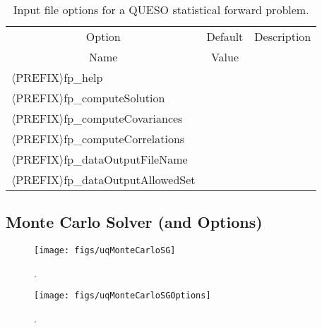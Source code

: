 \begin{table}[!h]
\begin{center}
\begin{tabular}{|l|c|c|}
\hline
\multicolumn{1}{|c|}{Option}                     & Default & Description \\
\multicolumn{1}{|c|}{Name}                       & Value   &             \\
\hline
\hline
$\langle$PREFIX$\rangle$fp\_help                 &         &             \\
\hline
$\langle$PREFIX$\rangle$fp\_computeSolution      &         &             \\
\hline
$\langle$PREFIX$\rangle$fp\_computeCovariances   &         &             \\
\hline
$\langle$PREFIX$\rangle$fp\_computeCorrelations  &         &             \\
\hline
$\langle$PREFIX$\rangle$fp\_dataOutputFileName   &         &             \\
\hline
$\langle$PREFIX$\rangle$fp\_dataOutputAllowedSet &         &             \\
\hline
\end{tabular}
\end{center}
\caption{
Input file options for a QUESO statistical forward problem.
}
\label{tab-sfp-options}
\end{table}

\clearpage
\subsection{Monte Carlo Solver (and Options)}

\begin{figure}[h!]
\centerline{
\texttt{[image: figs/uqMonteCarloSG]}
}
\caption{
{\color{red}{The Monte Carlo sequence generator class}}.
}
\label{fig-monte-carlo-solver-class}
\end{figure}

\begin{figure}[h!]
\begin{center}
\texttt{[image: figs/uqMonteCarloSGOptions]}
\end{center}
\caption{
{\color{red}{The Monte Carlo sequence generator options class}}.
}
\label{fig-monte-carlo-options-class}
\end{figure}

